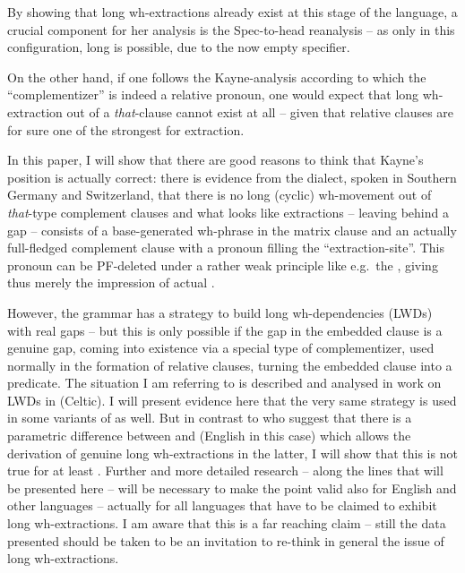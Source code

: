 \documentclass[output=paper]{langsci/langscibook}
\begin{document}
By showing that long wh-extractions already exist at this stage of the
language, a crucial component for her analysis is the Spec-to-head reanalysis --
as only in this configuration, long  is possible, due to the
now empty specifier.

On the other hand, if one follows the Kayne-analysis according to which the
\enquote{complementizer} is indeed a relative pronoun, one would expect that long
wh-extraction out of a \emph{that}-clause cannot exist at all -- given that
relative clauses are for sure one of the strongest  for extraction.

In this paper, I will show that there are good reasons to think that Kayne’s
position is actually correct: there is evidence from the  dialect,
spoken in Southern Germany and Switzerland, that there is no long (cyclic)
wh-movement out of \emph{that}-type complement clauses and what looks like
extractions -- leaving behind a gap -- consists of a base-generated wh-phrase in
the matrix clause and an actually full-fledged complement clause with a
pronoun filling the \enquote{extraction-site}. This pronoun can be PF-deleted under a
rather weak principle like e.g.\ the 
\citep{Chomsky:81}, giving thus merely the impression of actual .

However, the grammar has a strategy to build long wh-dependencies
(\glspl{LWD}) with real gaps -- but this is only possible if the
gap in the embedded clause is a genuine gap, coming into existence via a
special type of complementizer, used normally in the formation of relative
clauses, turning the embedded clause into a predicate. The situation I am
referring to is described and analysed in  work on
\glspl{LWD} in  (Celtic). I will present evidence here that the very same
strategy is used in some variants of  as well. But in contrast to
\citet{AdgRam2005} who suggest that there is a parametric difference
between  and  (English in this case) which allows the derivation
of genuine long wh-extractions in the latter, I will show that this is not true
for at least . Further and more detailed research -- along the lines
that will be presented here -- will be necessary to make the point valid also
for English and other  languages -- actually for all languages that have
to be claimed to exhibit long wh-extractions. I am aware that this is a far
reaching claim -- still the data presented should be taken to be an invitation
to re-think in general the issue of long wh-extractions.
\end{document}
